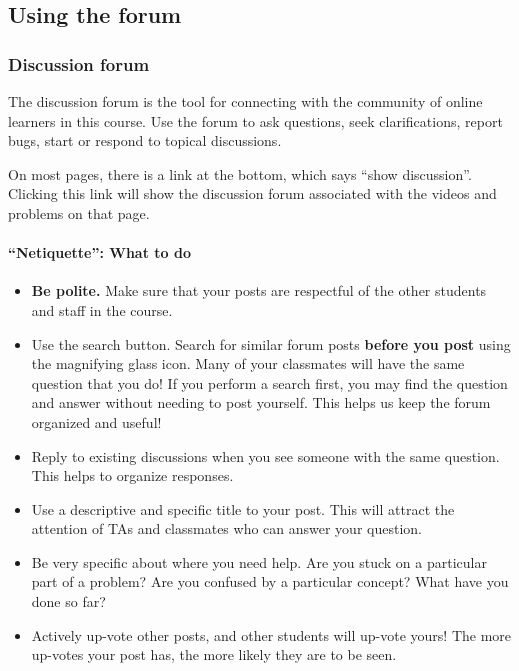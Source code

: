\documentclass[pdftex, brazil, 12pt, twoside]{article}
\begin{document}
\subsection{Using the forum}
\label{gs-forum}

\subsubsection{Discussion forum}
\label{gs-forum-forum}

The discussion forum is the tool for connecting with the community of online learners in this course. Use the forum to ask questions, seek clarifications, report bugs, start or respond to topical discussions.

On most pages, there is a link at the bottom, which says ``show discussion''. Clicking this link will show the discussion forum associated with the videos and problems on that page.

\paragraph{``Netiquette'': What to do}

\begin{itemize}[noitemsep]
\item \textbf{Be polite.} Make sure that your posts are respectful of the other students and staff in the course.
\item Use the search button. Search for similar forum posts \textbf{before you post} using the magnifying glass icon. Many of your classmates will have the same question that you do! If you perform a search first, you may find the question and answer without needing to post yourself. This helps us keep the forum organized and useful!
\item Reply to existing discussions when you see someone with the same question. This helps to organize responses.
\item Use a descriptive and specific title to your post. This will attract the attention of TAs and classmates who can answer your question.
\item Be very specific about where you need help. Are you stuck on a particular part of a problem? Are you confused by a particular concept? What have you done so far?
\item Actively up-vote other posts, and other students will up-vote yours! The more up-votes your post has, the more likely they are to be seen.
\end{itemize}
\end{document}
